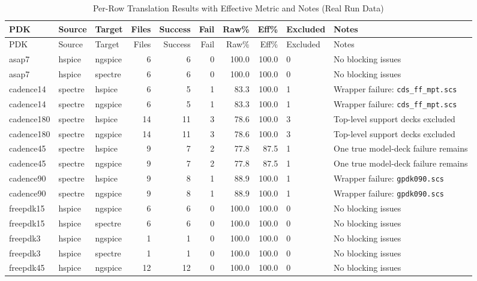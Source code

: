 \documentclass[12pt,a4paper,oneside]{report}
\begin{document}
\begin{landscape}
\small
\setlength{\LTleft}{0pt}
\setlength{\LTright}{0pt}
\begin{longtable}{p{2.2cm}p{1.6cm}p{1.5cm}r r r r r p{2.8cm}p{4.6cm}}
\caption{Per-Row Translation Results with Effective Metric and Notes (Real Run Data)}
\label{tab:translation-matrix}\\
\toprule
PDK & Source & Target & Files & Success & Fail & Raw\% & Eff\% & Excluded & Notes \\
\midrule
\endfirsthead
\toprule
PDK & Source & Target & Files & Success & Fail & Raw\% & Eff\% & Excluded & Notes \\
\midrule
\endhead
asap7 & hspice & ngspice & 6 & 6 & 0 & 100.0 & 100.0 & 0 & No blocking issues \\
asap7 & hspice & spectre & 6 & 6 & 0 & 100.0 & 100.0 & 0 & No blocking issues \\
cadence14 & spectre & hspice & 6 & 5 & 1 & 83.3 & 100.0 & 1 & Wrapper failure: \texttt{cds\_ff\_mpt.scs} \\
cadence14 & spectre & ngspice & 6 & 5 & 1 & 83.3 & 100.0 & 1 & Wrapper failure: \texttt{cds\_ff\_mpt.scs} \\
cadence180 & spectre & hspice & 14 & 11 & 3 & 78.6 & 100.0 & 3 & Top-level support decks excluded \\
cadence180 & spectre & ngspice & 14 & 11 & 3 & 78.6 & 100.0 & 3 & Top-level support decks excluded \\
cadence45 & spectre & hspice & 9 & 7 & 2 & 77.8 & 87.5 & 1 & One true model-deck failure remains \\
cadence45 & spectre & ngspice & 9 & 7 & 2 & 77.8 & 87.5 & 1 & One true model-deck failure remains \\
cadence90 & spectre & hspice & 9 & 8 & 1 & 88.9 & 100.0 & 1 & Wrapper failure: \texttt{gpdk090.scs} \\
cadence90 & spectre & ngspice & 9 & 8 & 1 & 88.9 & 100.0 & 1 & Wrapper failure: \texttt{gpdk090.scs} \\
freepdk15 & hspice & ngspice & 6 & 6 & 0 & 100.0 & 100.0 & 0 & No blocking issues \\
freepdk15 & hspice & spectre & 6 & 6 & 0 & 100.0 & 100.0 & 0 & No blocking issues \\
freepdk3 & hspice & ngspice & 1 & 1 & 0 & 100.0 & 100.0 & 0 & No blocking issues \\
freepdk3 & hspice & spectre & 1 & 1 & 0 & 100.0 & 100.0 & 0 & No blocking issues \\
freepdk45 & hspice & ngspice & 12 & 12 & 0 & 100.0 & 100.0 & 0 & No blocking issues \\

\end{longtable}
\end{landscape}
\end{document}
